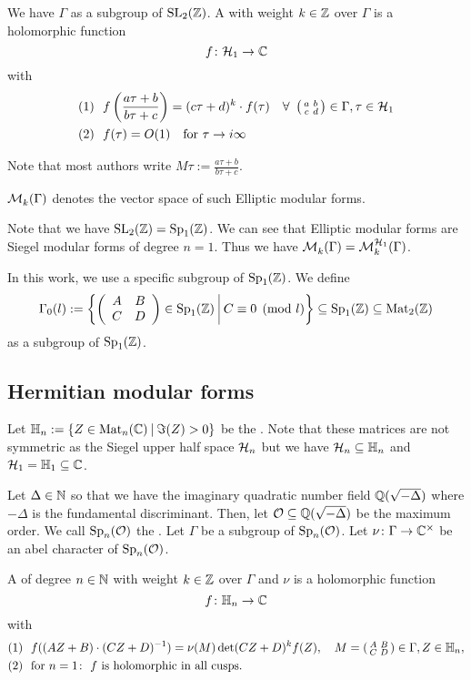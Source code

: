 We have $\Gamma$ as a subgroup of $\operatorname{SL}_2(\mathbb{Z})$. A  with weight $k \in \mathbb{Z}$ over $\Gamma$ is a holomorphic function
\[ f \colon \mathcal{H}_1 \rightarrow \mathbb{C} \]
with
\begin{align*}
(1) \ \ & f\left(\frac{a \tau + b}{b \tau + c}\right) = (c \tau + d)^k \cdot f(\tau) \quad \forall \ \left( \begin{smallmatrix} a & b \\ c & d \end{smallmatrix} \right) \in \Gamma, \tau \in \mathcal{H}_1 \\
(2) \ \ & f(\tau) = O(1) \quad \text{for } \tau \rightarrow i \infty
\end{align*}

Note that most authors write $M \tau := \frac{a \tau + b}{b \tau + c}$.

$\operatorname{\mathcal{M}}^{}_k (\Gamma)$ denotes the vector space of such Elliptic modular forms.

Note that we have $\operatorname{SL}_2(\mathbb{Z}) = \operatorname{Sp}_1(\mathbb{Z})$. We can see that Elliptic modular forms are Siegel modular forms of degree $n=1$. Thus we have $\operatorname{\mathcal{M}}^{}_k (\Gamma) = \operatorname{\mathcal{M}}^{\mathcal{H}_{1}}_k (\Gamma)$.

In this work, we use a specific subgroup of $\operatorname{Sp}_1(\mathbb{Z})$. We define
\[ \Gamma_0(l) := \Set{\SimpleMatrix{A}{B}{C}{D} \in \Sp_1(\Z)}{C \equiv 0 \pmod{l}} \subseteq \Sp_1(\Z) \subseteq \M_2(\Z) \]
as a subgroup of $\operatorname{Sp}_1(\mathbb{Z})$.

\subsection{Hermitian modular forms}

Let $\HalfPlane_n :=  \Set{ Z \in \M_n(\C) }{ \Im(Z) > 0}$ be the . Note that these matrices are not symmetric as the Siegel upper half space $\mathcal{H}_n$ but we have $\mathcal{H}_n \subseteq \mathbb{H}_n$ and $\mathcal{H}_1 = \mathbb{H}_1 \subseteq \mathbb{C}$.


Let $\Delta \in \mathbb{N}$ so that we have the imaginary quadratic number field $\mathbb{Q}(\sqrt{-\Delta})$ where $-\Delta$ is the fundamental discriminant.
Then, let $\mathcal{O} \subseteq \mathbb{Q}(\sqrt{-\Delta})$ be the maximum order.
We call $\operatorname{Sp}_n(\mathcal{O})$ the .
Let $\Gamma$ be a subgroup of $\operatorname{Sp}_n(\mathcal{O})$.
Let $\nu \colon \Gamma \rightarrow \mathbb{C}^\times$ be an abel character of $\operatorname{Sp}_n(\mathcal{O})$.

A 
of degree $n\in\mathbb{N}$
with weight $k\in \mathbb{Z}$
over $\Gamma$ and $\nu$
is a holomorphic function
\[ f \colon \mathbb{H}_n \rightarrow \mathbb{C} \]
with
\begin{align*}
(1) \ \ & f((A Z + B) \cdot (C Z + D)^{-1}) = \nu(M) \det(CZ + D)^k f(Z), \quad M = \left( \begin{smallmatrix} A & B \\ C & D \end{smallmatrix} \right) \in \Gamma, Z \in \mathbb{H}_n , \\
(2) \ \ & \text{for } n = 1 \colon \ \text{$f$ is holomorphic in all cusps} .
\end{align*}

